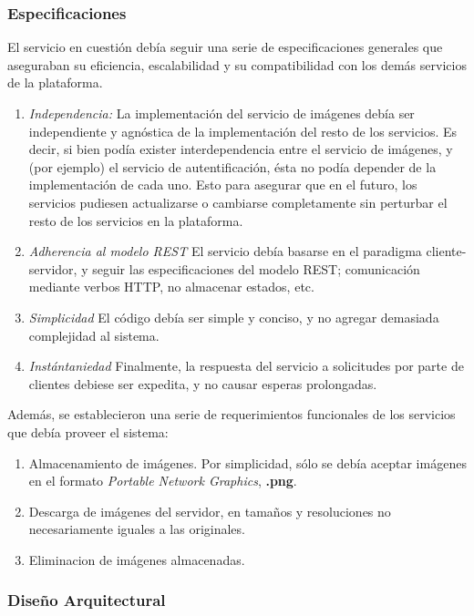 \documentclass[11pt,letterpaper]{article}
\begin{document}
\subsubsection{Especificaciones}

El servicio en cuestión debía seguir una serie de especificaciones generales que aseguraban su eficiencia, escalabilidad y su compatibilidad con los demás servicios de la plataforma.

\begin{enumerate}
    \item \emph{Independencia:} \@ La implementación del servicio de imágenes debía ser independiente y agnóstica de la implementación del resto de los servicios. Es decir, si bien podía exister interdependencia entre el servicio de imágenes, y (por ejemplo) el servicio de autentificación, ésta no podía depender de la implementación de cada uno. Esto para asegurar que en el futuro, los servicios pudiesen actualizarse o cambiarse completamente sin perturbar el resto de los servicios en la plataforma.
    \item \emph{Adherencia al modelo REST} \@ El servicio debía basarse en el paradigma cliente-servidor, y seguir las especificaciones del modelo REST; comunicación mediante verbos HTTP, no almacenar estados, etc.
    \item \emph{Simplicidad} \@ El código debía ser simple y conciso, y no agregar demasiada complejidad al sistema.
    \item \emph{Instántaniedad} \@ Finalmente, la respuesta del servicio a solicitudes por parte de clientes debiese ser expedita, y no causar esperas prolongadas.
\end{enumerate}

Además, se establecieron una serie de requerimientos funcionales de los servicios que debía proveer el sistema:
\begin{enumerate}
    \item Almacenamiento de imágenes. Por simplicidad, sólo se debía aceptar imágenes en el formato \emph{Portable Network Graphics}, \textbf{.png}.
    \item Descarga de imágenes del servidor, en tamaños y resoluciones no necesariamente iguales a las originales.
    \item Eliminacion de imágenes almacenadas.
\end{enumerate}
\newpage
\subsubsection{Diseño Arquitectural}
\end{document}
